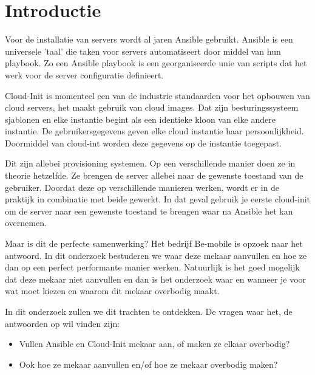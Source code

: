 
\section{Introductie} %
\label{sec:introductie}

Voor de installatie van servers wordt al jaren Ansible gebruikt. Ansible is een universele 'taal' die taken voor servers automatiseert door middel van hun playbook. Zo een Ansible playbook is een georganiseerde unie van scripts dat het werk voor de server configuratie definieert.

Cloud-Init is momenteel een van de industrie standaarden voor het opbouwen van cloud servers, het maakt gebruik van cloud images. Dat zijn besturingssysteem sjablonen en elke instantie begint als een identieke kloon van elke andere instantie. De gebruikersgegevens geven elke cloud instantie haar persoonlijkheid. Doormiddel van cloud-int worden deze gegevens op de instantie toegepast. 

Dit zijn allebei provisioning systemen. Op een verschillende manier doen ze in theorie hetzelfde. Ze brengen de server allebei naar de gewenste toestand van de gebruiker. Doordat deze op verschillende manieren werken, wordt er in de praktijk in combinatie met beide gewerkt. In dat geval gebruik je eerste cloud-init om de server naar een gewenste toestand te brengen waar na Ansible het kan overnemen.

Maar is dit de perfecte samenwerking? Het bedrijf Be-mobile is opzoek naar het antwoord. In dit onderzoek bestuderen we waar deze mekaar aanvullen en hoe ze dan op een perfect performante manier werken. Natuurlijk is het goed mogelijk dat deze mekaar niet aanvullen en dan is het onderzoek waar en wanneer je voor wat moet kiezen en waarom dit mekaar overbodig maakt. 

In dit onderzoek zullen we dit trachten te ontdekken. De vragen waar het, de antwoorden op wil vinden zijn:
\begin{itemize}
	\item Vullen Ansible en Cloud-Init mekaar aan, of maken ze elkaar overbodig?
	\item Ook hoe ze mekaar aanvullen en/of hoe ze mekaar overbodig maken?
\end{itemize}


